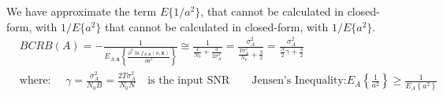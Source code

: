 \begin{itemize}
\noindent We have approximate the term \(E\{1/a^2\}\), that cannot be calculated in closed-form, with \(1/E\{a^2\}\) that cannot be calculated in closed-form, with \(1/E\{a^2\}\).
\begin{align*}
&BCRB(A) = - \frac{1}{ E_{A,\mathbf{x}} \left\{ \frac{\partial^2 \ln f_{A,\mathbf{x}}(a,\mathbf{x})}{\partial a^2} \right\} } 
\cong \frac{1}{ \frac{T}{N_0} + \frac{3}{2\sigma_A^2} } 
= \frac{\sigma_A^2}{ \frac{T\sigma_A^2}{N_0} + \frac{3}{2} } 
= \frac{\sigma_A^2}{ \frac{N}{2}\gamma + \frac{3}{2} }\\
&\text{where: } \quad \gamma = \frac{\sigma_A^2}{N_0 B} = \frac{2T\sigma_A^2}{N_0 N} \quad \text{is the input SNR}\qquad\text{Jensen's Inequality:} 
E_A \left\{ \frac{1}{a^2} \right\} \geq \frac{1}{E_A \left\{ a^2 \right\}}
\end{align*}
\end{itemize}
